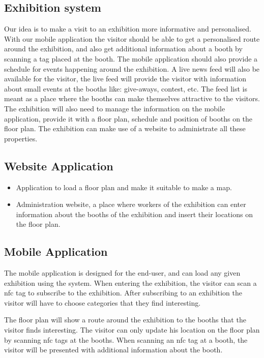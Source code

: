 \subsection*{Exhibition system}

Our idea is to make a visit to an exhibition more informative and personalised.  With our mobile application the visitor should be able to get a personalised  route around the exhibition, and also get additional information about a booth by scanning a tag placed at the booth. The mobile application should also provide a schedule for events happening around the exhibition. A live news feed will also be available for the visitor, the live feed will provide the visitor with information about small events at the booths like: give-aways, contest, etc. The feed list is meant as a place where the booths can make themselves attractive to the visitors. The exhibition will also need to manage the information on the mobile application, provide it with a floor plan, schedule and position of booths on the floor plan. The exhibition can make use of a website to administrate all these properties.

\subsection*{Website Application}
\begin{itemize}
\item Application to load a floor plan and make it suitable to make a map.
\item Administration website, a place where workers of the exhibition can enter information about the booths of the exhibition and insert their locations on the floor plan.
\end{itemize}
\subsection*{Mobile Application}

The mobile application is designed for the end-user, and can load any given exhibition using the system. When entering the exhibition, the visitor can scan a \ac{nfc} tag to subscribe to the exhibition. After subscribing to an exhibition the visitor will have to choose categories that they find interesting. 

The floor plan will show a route around the exhibition to the booths that the visitor finds interesting. The visitor can only update his location on the floor plan by scanning \ac{nfc} tags at the booths. When scanning an \ac{nfc} tag at a booth, the visitor will be presented with additional information about the booth. 

